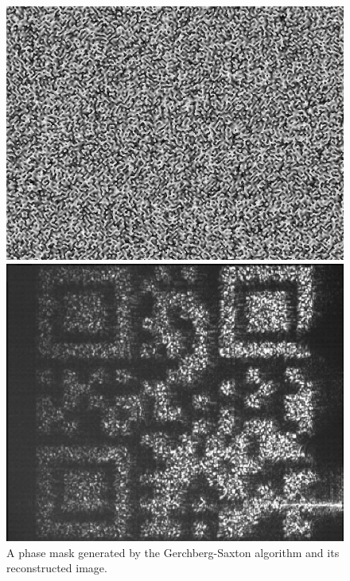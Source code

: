\documentclass{article}
\begin{document}
\begin{figure}[!phbt]
\begin{minipage}{0.45\linewidth}
    \centering
    \includegraphics[width=\linewidth]{img/QR1.eps}
\end{minipage}\hfil
\begin{minipage}{0.45\linewidth}
    \centering
    \includegraphics[width=\linewidth]{img/QR2.eps}
\end{minipage}
\caption{A phase mask generated by the Gerchberg-Saxton algorithm and its reconstructed image.}
\label{fig:qrcoderecon}
\end{figure}
\end{document}
